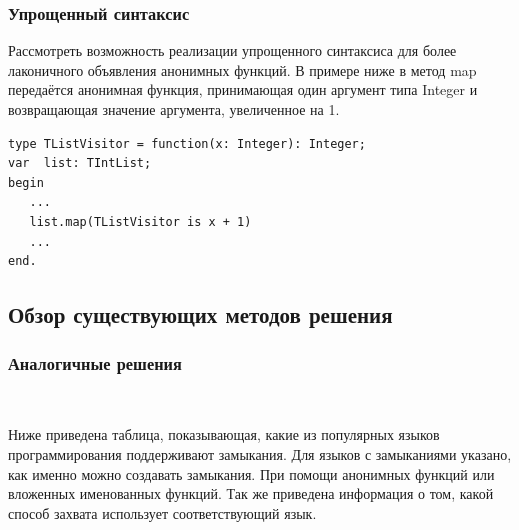 \documentclass{imcs}
\begin{document}

\subsubsection{Упрощенный синтаксис}
Рассмотреть возможность реализации упрощенного синтаксиса для более лаконичного объявления
анонимных функций. В примере ниже в метод map передаётся анонимная функция, принимающая
один аргумент типа Integer и возвращающая значение аргумента, увеличенное на 1.
\begin{lstlisting}
type TListVisitor = function(x: Integer): Integer;
var  list: TIntList;
begin
   ...
   list.map(TListVisitor is x + 1)
   ...
end.
\end{lstlisting}

\subsection{Обзор существующих методов решения}

\subsubsection{Аналогичные решения}

~~~

Ниже приведена таблица, показывающая, какие из популярных языков программирования поддерживают
замыкания. Для языков с замыканиями указано, как именно можно создавать
замыкания. При помощи анонимных функций или вложенных именованных функций.
Так же приведена информация о том, какой способ захвата использует соответствующий язык.
\end{document}

